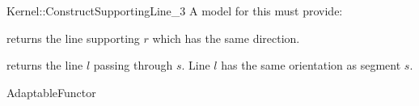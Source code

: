 \begin{ccRefFunctionObjectConcept}{Kernel::ConstructSupportingLine_3}
A model for this must provide:


       {returns the line supporting $r$ which has the same direction.}

       {returns the line $l$ passing through $s$. Line $l$  has the
        same orientation as segment $s$.}

\ccRefines
AdaptableFunctor

\ccSeeAlso
{} \\

\end{ccRefFunctionObjectConcept}
